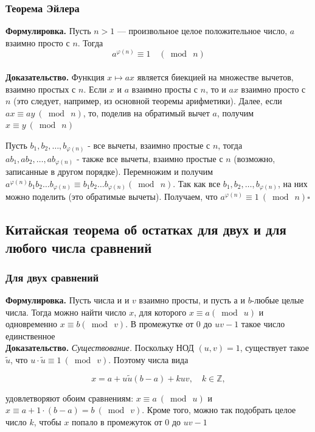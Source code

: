 \documentclass[a4paper]{article}
\newcommand{\qed}{\hfill$\square$}
\begin{document}
\subsubsection*{Теорема Эйлера}
\textbf{Формулировка.} Пусть $n > 1$ — произвольное целое положительное число, $a$ взаимно просто с $n$. Тогда
$$a^{\varphi(n)}\equiv 1\quad (\bmod\ n)$$\\[2mm]
\indent\textbf{Доказательство.} Функция $x \mapsto a x$ является биекцией на множестве вычетов, взаимно простых с $n$. Если $x$ и $a$ взаимно просты с $n$, то и $a x$ взаимно просто с $n$ (это следует, например, из основной теоремы арифметики). Далее, если $a x \equiv a y\ (\bmod\ n)$, то, поделив на обратимый вычет $a$, получим $x \equiv y\ (\bmod\ n)$

Пусть $b_{1}, b_{2}, \ldots, b_{\varphi(n)}$ - все вычеты, взаимно простые с $n$, тогда $a b_{1}, a b_{2}, \ldots, a b_{\varphi(n)}$ - также все вычеты, взаимно простые с $n$ (возможно, записанные в другом порядке). Перемножим и получим $a^{\varphi(n)} b_{1} b_{2} \ldots b_{\varphi(n)} \equiv b_{1} b_{2} \ldots b_{\varphi(n)}(\bmod\ n)$. Так как все $b_{1}, b_{2}, \ldots, b_{\varphi(n)}$, на них можно поделить (это обратимые вычеты). Получаем, что $a^{\varphi(n)} \equiv 1\ (\bmod\ n)$\qed


\subsection{Китайская теорема об остатках для двух и для любого числа сравнений}

\subsubsection*{Для двух сравнений}
\textbf{Формулировка.} Пусть числа и и $v$ взаимно просты, и пусть а и $b$-любые целые числа. Тогда можно найти число $x$, для которого $x \equiv a(\bmod\ u)$ и одновременно $x \equiv b(\bmod\ v)$. В промежутке от 0 до $uv -1$ такое число единственное\\[2mm]
\indent\textbf{Доказательство.} \textit{Существование.} Поскольку НОД $(u, v)=1$, существует такое $\widetilde{u}$, что $u \cdot \widetilde{u} \equiv 1\ (\bmod\ v)$. Поэтому числа вида

$$
x=a+u \tilde{u}(b-a)+k u v, \quad k \in \mathbb{Z},
$$

удовлетворяют обоим сравнениям: $x \equiv a\ (\bmod\ u)$ и $x \equiv a+1 \cdot(b-a)=b\ (\bmod\ v)$. Кроме того, можно так подобрать целое число $k$, чтобы $x$ попало в промежуток от 0 до $u v-1$\\[2mm]
\end{document}
